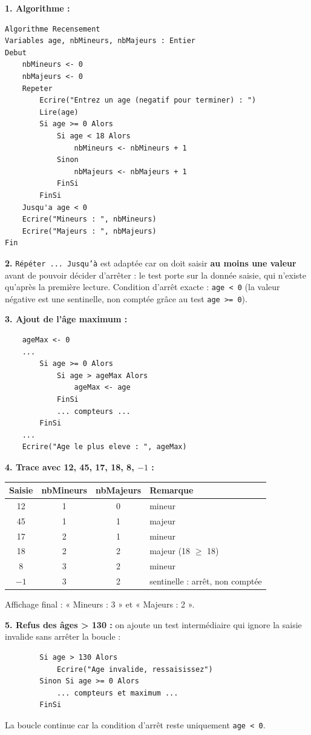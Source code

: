 \documentclass[11pt]{article}
\begin{document}
\begin{corrige}
\textbf{1. Algorithme :}
\begin{lstlisting}
Algorithme Recensement
Variables age, nbMineurs, nbMajeurs : Entier
Debut
    nbMineurs <- 0
    nbMajeurs <- 0
    Repeter
        Ecrire("Entrez un age (negatif pour terminer) : ")
        Lire(age)
        Si age >= 0 Alors
            Si age < 18 Alors
                nbMineurs <- nbMineurs + 1
            Sinon
                nbMajeurs <- nbMajeurs + 1
            FinSi
        FinSi
    Jusqu'a age < 0
    Ecrire("Mineurs : ", nbMineurs)
    Ecrire("Majeurs : ", nbMajeurs)
Fin
\end{lstlisting}

\textbf{2.} \texttt{Répéter ... Jusqu'à} est adaptée car on doit saisir \textbf{au moins une valeur} avant de pouvoir décider d'arrêter : le test porte sur la donnée saisie, qui n'existe qu'après la première lecture. Condition d'arrêt exacte : \texttt{age < 0} (la valeur négative est une sentinelle, non comptée grâce au test \texttt{age >= 0}).

\textbf{3. Ajout de l'âge maximum :}
\begin{lstlisting}
    ageMax <- 0
    ...
        Si age >= 0 Alors
            Si age > ageMax Alors
                ageMax <- age
            FinSi
            ... compteurs ...
        FinSi
    ...
    Ecrire("Age le plus eleve : ", ageMax)
\end{lstlisting}

\textbf{4. Trace avec 12, 45, 17, 18, 8, $-1$ :}
\begin{center}
\begin{tabularx}{0.85\linewidth}{|c|c|c|X|}
\hline
\rowcolor{popblueL} \textbf{Saisie} & \textbf{nbMineurs} & \textbf{nbMajeurs} & \textbf{Remarque} \\
\hline
12 & 1 & 0 & mineur \\
45 & 1 & 1 & majeur \\
17 & 2 & 1 & mineur \\
18 & 2 & 2 & majeur (18 $\ge$ 18) \\
8 & 3 & 2 & mineur \\
$-1$ & 3 & 2 & sentinelle : arrêt, non comptée \\
\hline
\end{tabularx}
\end{center}
Affichage final : « Mineurs : 3 » et « Majeurs : 2 ».

\textbf{5. Refus des âges > 130 :} on ajoute un test intermédiaire qui ignore la saisie invalide sans arrêter la boucle :
\begin{lstlisting}
        Si age > 130 Alors
            Ecrire("Age invalide, ressaisissez")
        Sinon Si age >= 0 Alors
            ... compteurs et maximum ...
        FinSi
\end{lstlisting}
La boucle continue car la condition d'arrêt reste uniquement \texttt{age < 0}.


\end{corrige}
\end{document}
